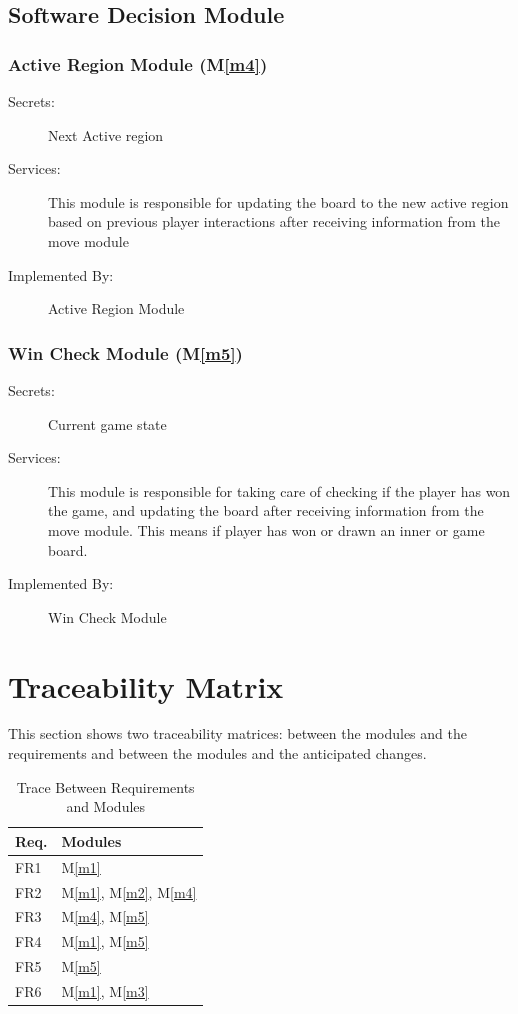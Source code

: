 \documentclass[12pt, titlepage]{article}
\newcommand{\mref}[1]{M\ref{#1}}
\begin{document}
\subsection{Software Decision Module}
\subsubsection{Active Region Module (\mref{m4})}
\begin{description}
\item[Secrets:] Next Active region
\item[Services:] This module is responsible for updating the board to the new active region based on previous player interactions after receiving information from the move module
\item[Implemented By:] Active Region Module
\end{description}

\subsubsection{Win Check Module (\mref{m5})}
\begin{description}
\item[Secrets:] Current game state
\item[Services:] This module is responsible for taking care of checking if the player has won the game, and updating the board after receiving information from the move module. This means if player has won or drawn an inner or game board.
\item[Implemented By:] Win Check Module
\end{description}

\section{Traceability Matrix} \label{SecTM}

This section shows two traceability matrices: between the modules and the
requirements and between the modules and the anticipated changes.

\begin{table}[H]
\centering
\begin{tabular}{p{} p{}}
\toprule
\textbf{Req.} & \textbf{Modules}\\
\midrule
FR1 & \mref{m1}\\
FR2 & \mref{m1}, \mref{m2}, \mref{m4}\\
FR3 & \mref{m4}, \mref{m5}\\
FR4 & \mref{m1}, \mref{m5}\\
FR5 & \mref{m5}\\
FR6 & \mref{m1}, \mref{m3}\\
\bottomrule
\end{tabular}
\caption{Trace Between Requirements and Modules}
\label{TblRT}
\end{table}
\end{document}
